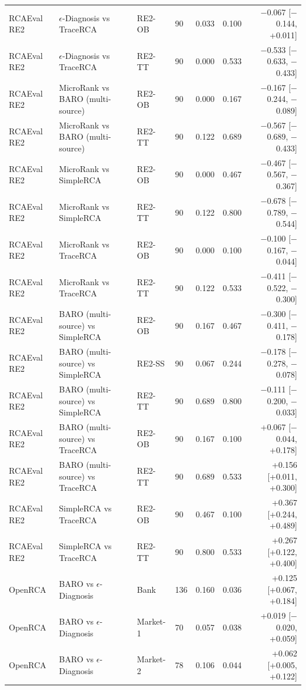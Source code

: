 {\begin{longtable}{llllrrr}
RCAEval RE2 & $\epsilon$-Diagnosis vs TraceRCA & RE2-OB & 90 & 0.033 & 0.100 & $-$0.067 [$-$0.144, +0.011] \\
RCAEval RE2 & $\epsilon$-Diagnosis vs TraceRCA & RE2-TT & 90 & 0.000 & 0.533 & $-$0.533 [$-$0.633, $-$0.433] \\
RCAEval RE2 & MicroRank vs BARO (multi-source) & RE2-OB & 90 & 0.000 & 0.167 & $-$0.167 [$-$0.244, $-$0.089] \\
RCAEval RE2 & MicroRank vs BARO (multi-source) & RE2-TT & 90 & 0.122 & 0.689 & $-$0.567 [$-$0.689, $-$0.433] \\
RCAEval RE2 & MicroRank vs SimpleRCA & RE2-OB & 90 & 0.000 & 0.467 & $-$0.467 [$-$0.567, $-$0.367] \\
RCAEval RE2 & MicroRank vs SimpleRCA & RE2-TT & 90 & 0.122 & 0.800 & $-$0.678 [$-$0.789, $-$0.544] \\
RCAEval RE2 & MicroRank vs TraceRCA & RE2-OB & 90 & 0.000 & 0.100 & $-$0.100 [$-$0.167, $-$0.044] \\
RCAEval RE2 & MicroRank vs TraceRCA & RE2-TT & 90 & 0.122 & 0.533 & $-$0.411 [$-$0.522, $-$0.300] \\
RCAEval RE2 & BARO (multi-source) vs SimpleRCA & RE2-OB & 90 & 0.167 & 0.467 & $-$0.300 [$-$0.411, $-$0.178] \\
RCAEval RE2 & BARO (multi-source) vs SimpleRCA & RE2-SS & 90 & 0.067 & 0.244 & $-$0.178 [$-$0.278, $-$0.078] \\
RCAEval RE2 & BARO (multi-source) vs SimpleRCA & RE2-TT & 90 & 0.689 & 0.800 & $-$0.111 [$-$0.200, $-$0.033] \\
RCAEval RE2 & BARO (multi-source) vs TraceRCA & RE2-OB & 90 & 0.167 & 0.100 & +0.067 [$-$0.044, +0.178] \\
RCAEval RE2 & BARO (multi-source) vs TraceRCA & RE2-TT & 90 & 0.689 & 0.533 & +0.156 [+0.011, +0.300] \\
RCAEval RE2 & SimpleRCA vs TraceRCA & RE2-OB & 90 & 0.467 & 0.100 & +0.367 [+0.244, +0.489] \\
RCAEval RE2 & SimpleRCA vs TraceRCA & RE2-TT & 90 & 0.800 & 0.533 & +0.267 [+0.122, +0.400] \\
OpenRCA & BARO vs $\epsilon$-Diagnosis & Bank & 136 & 0.160 & 0.036 & +0.125 [+0.067, +0.184] \\
OpenRCA & BARO vs $\epsilon$-Diagnosis & Market-1 & 70 & 0.057 & 0.038 & +0.019 [$-$0.020, +0.059] \\
OpenRCA & BARO vs $\epsilon$-Diagnosis & Market-2 & 78 & 0.106 & 0.044 & +0.062 [+0.005, +0.122] \\

\end{longtable}}
